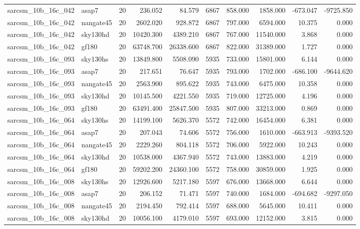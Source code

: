 \begin{longtable}{llrrrrrrrr}
sarcsm\_10b\_16c\_042 & asap7 & 20 & 236.052 & 84.579 & 6867 & 858.000 & 1858.000 & -673.047 & -9725.850 \\
sarcsm\_10b\_16c\_042 & nangate45 & 20 & 2602.020 & 928.872 & 6867 & 797.000 & 6594.000 & 10.375 & 0.000 \\
sarcsm\_10b\_16c\_042 & sky130hd & 20 & 10420.300 & 4389.210 & 6867 & 767.000 & 11540.000 & 3.868 & 0.000 \\
sarcsm\_10b\_16c\_042 & gf180 & 20 & 63748.700 & 26338.600 & 6867 & 822.000 & 31389.000 & 1.727 & 0.000 \\
sarcsm\_10b\_16c\_093 & sky130hs & 20 & 13849.800 & 5508.090 & 5935 & 733.000 & 15801.000 & 6.144 & 0.000 \\
sarcsm\_10b\_16c\_093 & asap7 & 20 & 217.651 & 76.647 & 5935 & 793.000 & 1702.000 & -686.100 & -9644.620 \\
sarcsm\_10b\_16c\_093 & nangate45 & 20 & 2563.900 & 895.622 & 5935 & 743.000 & 6475.000 & 10.358 & 0.000 \\
sarcsm\_10b\_16c\_093 & sky130hd & 20 & 10145.500 & 4221.550 & 5935 & 719.000 & 12725.000 & 4.196 & 0.000 \\
sarcsm\_10b\_16c\_093 & gf180 & 20 & 63491.400 & 25847.500 & 5935 & 807.000 & 33213.000 & 0.869 & 0.000 \\
sarcsm\_10b\_16c\_064 & sky130hs & 20 & 14199.100 & 5626.370 & 5572 & 742.000 & 16454.000 & 6.381 & 0.000 \\
sarcsm\_10b\_16c\_064 & asap7 & 20 & 207.043 & 74.606 & 5572 & 756.000 & 1610.000 & -663.913 & -9393.520 \\
sarcsm\_10b\_16c\_064 & nangate45 & 20 & 2229.260 & 804.118 & 5572 & 706.000 & 5922.000 & 10.243 & 0.000 \\
sarcsm\_10b\_16c\_064 & sky130hd & 20 & 10538.000 & 4367.940 & 5572 & 743.000 & 13883.000 & 4.219 & 0.000 \\
sarcsm\_10b\_16c\_064 & gf180 & 20 & 59202.200 & 24360.100 & 5572 & 758.000 & 30859.000 & 1.925 & 0.000 \\
sarcsm\_10b\_16c\_008 & sky130hs & 20 & 12926.600 & 5217.180 & 5597 & 676.000 & 13668.000 & 6.644 & 0.000 \\
sarcsm\_10b\_16c\_008 & asap7 & 20 & 206.152 & 71.471 & 5597 & 740.000 & 1684.000 & -694.682 & -9297.050 \\
sarcsm\_10b\_16c\_008 & nangate45 & 20 & 2194.450 & 792.414 & 5597 & 688.000 & 5645.000 & 10.411 & 0.000 \\
sarcsm\_10b\_16c\_008 & sky130hd & 20 & 10056.100 & 4179.010 & 5597 & 693.000 & 12152.000 & 3.815 & 0.000 \\

\end{longtable}
